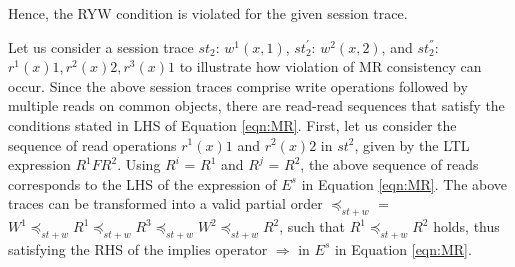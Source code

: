\documentclass[journal,compsoc]{IEEEtran}
\begin{document}
  Hence, the RYW condition is violated for the given session trace.
 \par Let us consider a session trace $\mathit{st}_2$:  $w^1(x,1)$, $\mathit{st}_2^{'}$: $w^2(x,2)$, and $\mathit{st}_2^{''}$: $r^1(x){1}, r^2(x){2}, r^3(x){1}$ to illustrate how
 violation of MR consistency can occur. Since the above session traces comprise write operations followed by multiple reads on common objects, there are read-read sequences that satisfy the conditions stated in LHS of Equation \ref{eqn:MR}.
 First, let us consider the sequence of read operations $r^1(x){1}$ and $r^2(x){2}$ in $\mathit{st}^2$, given by the LTL expression $R^1 F R^2$.
Using $R^i$ = $R^1$ and $R^j$ = $R^2$, the above sequence of reads corresponds to the LHS of the expression of  $E^{s}$ in Equation \ref{eqn:MR}.  
  The above traces can be transformed into a valid partial order $\preccurlyeq_{\mathit{st}+w}$ =
 $W^1 \preccurlyeq_{\mathit{st}+w} R^1 \preccurlyeq_{\mathit{st}+w} R^3 \preccurlyeq_{\mathit{st}+w} W^2 \preccurlyeq_{\mathit{st}+w} R^2$, such that $R^1 \preccurlyeq_{\mathit{st}+w} R^2$ holds, thus satisfying
 the RHS of the implies operator $\Rightarrow$
 in  $E^{s}$ in Equation \ref{eqn:MR}.  
\end{document}

